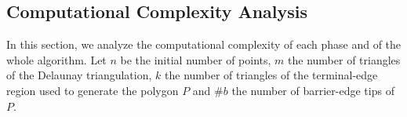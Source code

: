 






\subsection{Computational Complexity Analysis}
\label{sub:Complexity Analysis}

In this section, we analyze the computational complexity of each phase and of the whole algorithm. Let  $n$ be the initial number of points, $m$ the number of triangles of the Delaunay triangulation, $k$ the number of triangles of the terminal-edge region used to generate the polygon $P$ and $\#b$ the number of barrier-edge tips of $P$.  

